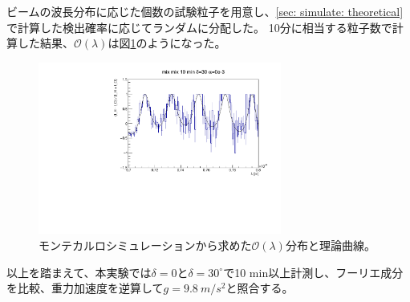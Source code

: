\documentclass[dvipdfmx]{jsarticle}
\begin{document}
ビームの波長分布に応じた個数の試験粒子を用意し、\ref{sec: simulate: theoretical}で計算した検出確率に応じてランダムに分配した。
10分に相当する粒子数で計算した結果、$\mathcal{O}(\lambda)$は図\ref{fig: simulate: oscillation of montecarlo and theoretical}のようになった。

\begin{figure}
    \centering
    \includegraphics[width=8cm]{img/mix_mix_30deg_10min_ALPHA0e-3_lmd7e-10to8e-10.pdf}
    \caption{
        モンテカルロシミュレーションから求めた$\mathscr{O}(\lambda)$分布と理論曲線。
    }
    \label{fig: simulate: oscillation of montecarlo and theoretical}
\end{figure}

以上を踏まえて、本実験では$\delta=0$と$\delta=30^\circ$で10 min以上計測し、フーリエ成分を比較、重力加速度を逆算して$g=\SI{9.8}{m/s^2}$と照合する。
\end{document}
